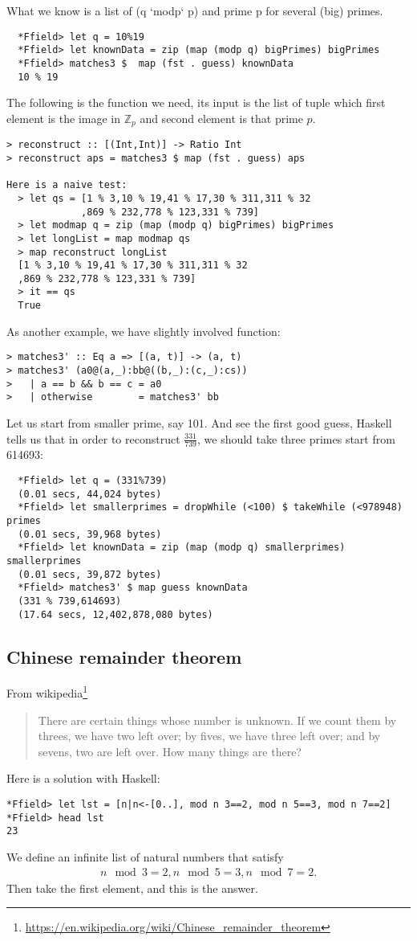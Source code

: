 \documentclass[11pt]{book}
\begin{document}
What we know is a list of (q `modp` p) and prime p for several (big) primes.
\begin{verbatim}
  *Ffield> let q = 10%19
  *Ffield> let knownData = zip (map (modp q) bigPrimes) bigPrimes  
  *Ffield> matches3 $  map (fst . guess) knownData 
  10 % 19
\end{verbatim}
The following is the function we need, its input is the list of tuple which first element is the image in $\mathbb{Z}_p$ and second element is that prime $p$.
\begin{verbatim}
> reconstruct :: [(Int,Int)] -> Ratio Int
> reconstruct aps = matches3 $ map (fst . guess) aps

Here is a naive test:
  > let qs = [1 % 3,10 % 19,41 % 17,30 % 311,311 % 32
             ,869 % 232,778 % 123,331 % 739]
  > let modmap q = zip (map (modp q) bigPrimes) bigPrimes 
  > let longList = map modmap qs
  > map reconstruct longList 
  [1 % 3,10 % 19,41 % 17,30 % 311,311 % 32
  ,869 % 232,778 % 123,331 % 739]
  > it == qs
  True
\end{verbatim}

As another example, we have slightly involved function:
\begin{verbatim}
> matches3' :: Eq a => [(a, t)] -> (a, t)
> matches3' (a0@(a,_):bb@((b,_):(c,_):cs))
>   | a == b && b == c = a0
>   | otherwise        = matches3' bb
\end{verbatim}
Let us start from smaller prime, say 101.
And see the first good guess, Haskell tells us that in order to reconstruct $\frac{331}{739}$, we should take three primes start from 614693:
\begin{verbatim}
  *Ffield> let q = (331%739)
  (0.01 secs, 44,024 bytes)
  *Ffield> let smallerprimes = dropWhile (<100) $ takeWhile (<978948) primes
  (0.01 secs, 39,968 bytes)
  *Ffield> let knownData = zip (map (modp q) smallerprimes) smallerprimes 
  (0.01 secs, 39,872 bytes)
  *Ffield> matches3' $ map guess knownData 
  (331 % 739,614693)
  (17.64 secs, 12,402,878,080 bytes)
\end{verbatim}

\subsection{Chinese remainder theorem}
From wikipedia\footnote{
\url{https://en.wikipedia.org/wiki/Chinese_remainder_theorem}
}
\begin{quotation}
There are certain things whose number is unknown. If we count them by threes, we have two left over; by fives, we have three left over; and by sevens, two are left over. How many things are there? 
\end{quotation}
Here is a solution with Haskell:
\begin{verbatim}
*Ffield> let lst = [n|n<-[0..], mod n 3==2, mod n 5==3, mod n 7==2]
*Ffield> head lst
23
\end{verbatim}
We define an infinite list of natural numbers that satisfy
\begin{eqnarray}
n \mod 3 = 2, n \mod 5 = 3, n \mod 7 = 2.
\end{eqnarray}
Then take the first element, and this is the answer.
\end{document}
